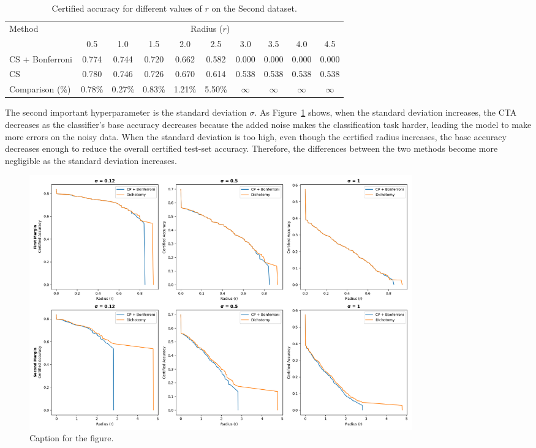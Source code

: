 \begin{table}[htbp]
    \centering
    \caption{Certified accuracy for different values of $r$ on the Second dataset.}
    \label{tab:simplified-certified-accuracy}
    \renewcommand{\arraystretch}{1.2}
    \begin{tabular}{l*{9}{c}}
        \toprule
        Method & \multicolumn{9}{c}{Radius ($r$)} \\
        \cmidrule(l){2-10}
        & 0.5 & 1.0 & 1.5 & 2.0 & 2.5 & 3.0 & 3.5 & 4.0 & 4.5 \\
        \midrule
        CS + Bonferroni & 0.774 & 0.744 & 0.720 & 0.662 & 0.582 & 0.000 & 0.000 & 0.000 & 0.000 \\
        CS              & 0.780 & 0.746 & 0.726 & 0.670 & 0.614 & 0.538 & 0.538 & 0.538 & 0.538 \\
        Comparison (\%) & 0.78\% & 0.27\% & 0.83\% & 1.21\% & 5.50\% & $\infty$ & $\infty$ & $\infty$ & $\infty$ \\
        \bottomrule
    \end{tabular}
\end{table}

The second important hyperparameter is the standard deviation $\sigma$.
As Figure~\ref{fig:discrete_sigma} shows, when the standard deviation increases, the CTA decreases as the classifier’s base accuracy decreases because the added noise makes the classification task harder, leading the model to make more errors on the noisy data.
When the standard deviation is too high, even though the certified radius increases, the base accuracy decreases enough to reduce the overall certified test-set accuracy.
Therefore, the differences between the two methods become more negligible as the standard deviation increases.

\begin{figure}[htbp]
    \centering
    \includegraphics[width=0.8\textwidth]{images/discrete_sigma}
    \caption{Caption for the figure.}
    \label{fig:discrete_sigma}
\end{figure}

